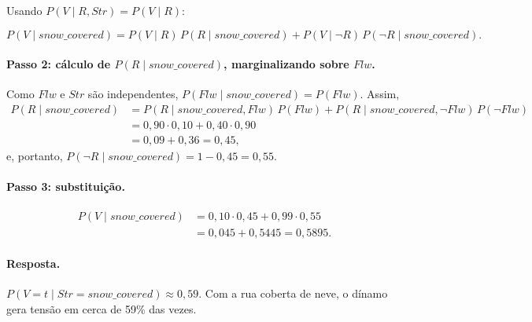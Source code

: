 \documentclass[12pt,a4paper]{article}
\newcommand{\Str}{\mathit{Str}}
\newcommand{\Flw}{\mathit{Flw}}
\newcommand{\snow}{\mathit{snow\_covered}}
\begin{document}
Usando $P(V \mid R, \Str) = P(V \mid R)$:

\[
P(V \mid \snow) = P(V \mid R)\, P(R \mid \snow) + P(V \mid \neg R)\, P(\neg R \mid \snow).
\]

\paragraph{Passo 2: cálculo de $P(R \mid \snow)$, marginalizando sobre $\Flw$.}
Como $\Flw$ e $\Str$ são independentes, $P(\Flw \mid \snow) = P(\Flw)$. Assim,
\begin{align*}
P(R \mid \snow)
 &= P(R \mid \snow, \Flw)\, P(\Flw) + P(R \mid \snow, \neg \Flw)\, P(\neg \Flw) \\
 &= 0{,}90 \cdot 0{,}10 + 0{,}40 \cdot 0{,}90 \\
 &= 0{,}09 + 0{,}36 = 0{,}45 ,
\end{align*}
e, portanto, $P(\neg R \mid \snow) = 1 - 0{,}45 = 0{,}55$.

\paragraph{Passo 3: substituição.}
\begin{align*}
P(V \mid \snow) &= 0{,}10 \cdot 0{,}45 + 0{,}99 \cdot 0{,}55 \\
                &= 0{,}045 + 0{,}5445 = 0{,}5895 .
\end{align*}

\paragraph{Resposta.} $P(V = t \mid \Str = \mathit{snow\_covered}) \approx 0{,}59$. Com a rua coberta de
neve, o dínamo gera tensão em cerca de 59\% das vezes.
\end{document}
